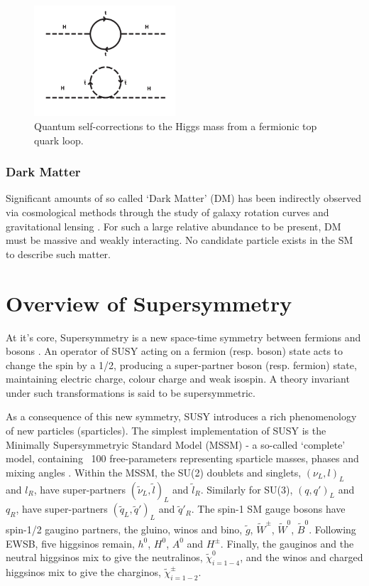 \begin{figure}[ht!]
\centering
\includegraphics[width=0.47\textwidth,trim=0 250 0 0, clip=true]
{Figs/feynman/600px-Hqmc-vector.png}
\caption{Quantum self-corrections to the Higgs mass from a fermionic top quark
loop.}
\label{fig:quantum_higgs_fermion_loop}
\end{figure}

\subsubsection{Dark Matter}
Significant amounts of so called `Dark Matter' (DM) has been indirectly observed
via cosmological methods through the study of galaxy rotation curves and
gravitational lensing \cite{Corbelli15012000,0004-637X-744-2-159}. For such a
large relative abundance to be present, DM must be massive and weakly
interacting. No candidate particle exists in the SM to describe such
matter.

\section{Overview of Supersymmetry}  %
\label{sec:theory_overview}
At it's core, Supersymmetry is a new space-time symmetry
between fermions and bosons \cite{ref:SUSY-1,ref:SUSY0,ref:SUSY1,ref:SUSY2,ref:SUSY3,ref:SUSY4}
. An operator of SUSY acting on a fermion 
(resp. boson) state acts to change the spin by a 1/2, producing a super-partner
boson (resp. fermion) state, maintaining electric charge, colour charge and weak
isospin. A theory invariant under such transformations is said to be
supersymmetric.

As a consequence of this new symmetry, SUSY introduces a rich phenomenology of
new particles (sparticles). The simplest implementation of SUSY is the
Minimally
Supersymmetryic Standard Model (MSSM) \cite{Martin:1997ns} - a so-called
`complete' model, containing
~100 free-parameters representing sparticle masses, phases and mixing angles 
\cite{Dimopoulos:1995ju}.
Within the MSSM, the SU(2) doublets and singlets, $(\nu_L, l)_L$ and $l_R$,
have super-partners $(\tilde{\nu}_L, \tilde{l})_L$ and $\tilde{l}_R$. Similarly
for SU(3), $(q, q')_L$ and $q_R$,
have super-partners $(\tilde{q}_L, \tilde{q}')_L$ and $\tilde{q}'_R$. The
spin-1 SM gauge bosons have spin-1/2 gaugino partners, the gluino, winos and
bino, $\tilde{g}$, $\tilde{W}^{\pm}$, $\tilde{W}^0$, $\tilde{B}^0$.
Following EWSB, five higgsinos remain, $h^0$, $H^0$, $A^0$ and
$H^{\pm}$. Finally, the gauginos and the neutral higgsinos mix to give the
neutralinos, $\tilde{\chi}^0_{i=1-4}$, and the winos and charged higgsinos mix
to give the charginos, $\tilde{\chi}^{\pm}_{i=1-2}$.

